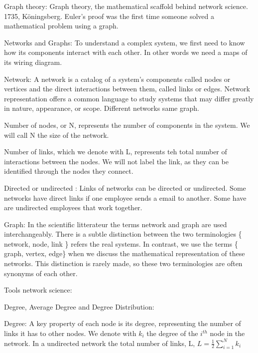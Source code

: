
Graph theory: 
    Graph theory, the mathematical scaffold behind network science. 1735, Köningsberg. Euler's proof was the first time someone solved a mathematical problem using a graph. 

Networks and Graphs: 
    To understand a complex system, we first need to know how its components interact with each other.  In other words we need a maps of its wiring diagram. 

Network: 
    A network is a catalog of a system's components called nodes or vertices and the direct interactions between them, called links or edges. Network representation offers a common language to study systems that may differ greatly in nature, appearance, or scope. Different networks same graph. 
    
    Number of nodes, or N, represents the number of components in the system. We will call N the size of the network.
    
    Number of links, which we denote with L, represents teh total number of interactions between the nodes. We will not label the link, as they can be identified through the nodes they connect. 

Directed or undirected : 
    Links of networks can be directed or undirected. Some networks have direct links if one employee sends a email to another. Some have are undirected employees that work together. 

Graph: 
    In the scientific litterateur the terms network and graph are used interchangeably. There is a subtle distinction between the two terminologies \{ network, node, link \} refers the real systems. In contrast, we use the terms \{ graph, vertex, edge\} when we discuss the mathematical representation of these networks. This distinction is rarely made, so these two terminologies are often synonyms of each other.

Tools network science: 

Degree, Average Degree and Degree Distribution: 

Degree: 
    A key property of each node is its degree, representing the number of links it has to other nodes. 
        We denote with $k_{i}$ the degree of the $i^{th}$ node in the network.
    In a undirected network the total number of links, L, 
    $L=  \frac{1}{2} \sum_{i=1}^{N}k_i$
    


